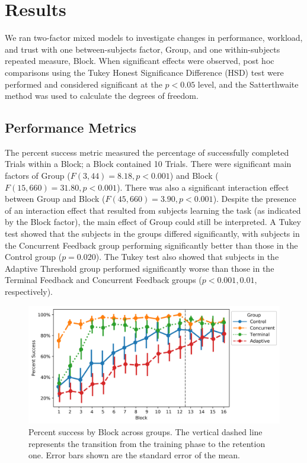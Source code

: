 \section{Results}

We ran two-factor mixed models to investigate changes in performance, workload, and trust with one between-subjects factor, Group, and one within-subjects repeated measure, Block.
When significant effects were observed, post hoc comparisons using the Tukey Honest Significance Difference (HSD) test were performed and considered significant at the $p < 0.05$ level, and the Satterthwaite method was used to calculate the degrees of freedom.

\subsection{Performance Metrics}
The percent success metric measured the percentage of successfully completed Trials within a Block; a Block contained 10 Trials.
There were significant main factors of Group ($F(3, 44) = 8.18, p < 0.001$) and Block ($F(15, 660) = 31.80, p < 0.001$).
There was also a significant interaction effect between Group and Block ($F(45, 660) = 3.90, p < 0.001$).
Despite the presence of an interaction effect that resulted from subjects learning the task (as indicated by the Block factor), the main effect of Group could still be interpreted.
A Tukey test showed that the subjects in the groups differed significantly, with subjects in the Concurrent Feedback group performing significantly better than those in the Control group ($p = 0.020$).
The Tukey test also showed that subjects in the Adaptive Threshold group performed significantly worse than those in the Terminal Feedback and Concurrent Feedback groups ($p < 0.001, 0.01,$ respectively).

\begin{figure}[bt!]
	\centering
	\includegraphics[height=.4\textwidth]{figures/EMG/PercentSuccess}
	\caption[Percent success by Block across groups]{Percent success by Block across groups.
		The vertical dashed line represents the transition from the training phase to the retention one.
		Error bars shown are the standard error of the mean.}
	\label{figure:label3}
\end{figure}

